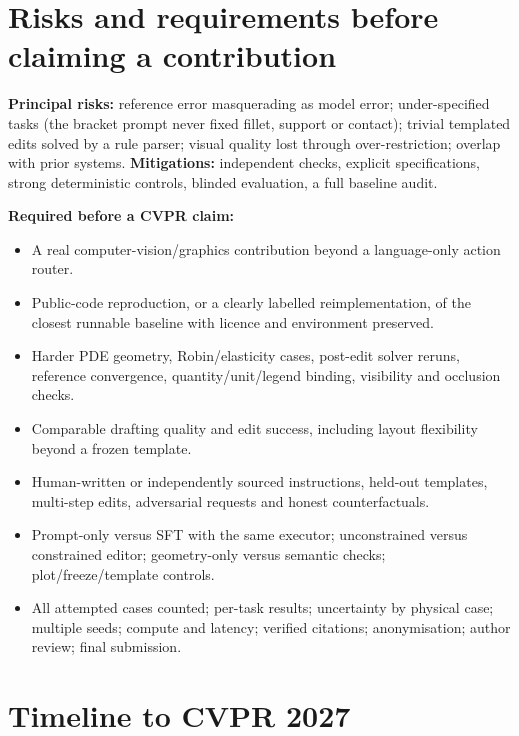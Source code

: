 \documentclass[11pt,a4paper]{article}
\begin{document}
\section{Risks and requirements before claiming a contribution}

\textbf{Principal risks:} reference error masquerading as model error; under-specified tasks (the bracket prompt never fixed fillet, support or contact); trivial templated edits solved by a rule parser; visual quality lost through over-restriction; overlap with prior systems. \textbf{Mitigations:} independent checks, explicit specifications, strong deterministic controls, blinded evaluation, a full baseline audit.

\textbf{Required before a CVPR claim:}
\begin{itemize}
  \item A real computer-vision/graphics contribution beyond a language-only action router.
  \item Public-code reproduction, or a clearly labelled reimplementation, of the closest runnable baseline with licence and environment preserved.
  \item Harder PDE geometry, Robin/elasticity cases, post-edit solver reruns, reference convergence, quantity/unit/legend binding, visibility and occlusion checks.
  \item Comparable drafting quality and edit success, including layout flexibility beyond a frozen template.
  \item Human-written or independently sourced instructions, held-out templates, multi-step edits, adversarial requests and honest counterfactuals.
  \item Prompt-only versus SFT with the same executor; unconstrained versus constrained editor; geometry-only versus semantic checks; plot/freeze/template controls.
  \item All attempted cases counted; per-task results; uncertainty by physical case; multiple seeds; compute and latency; verified citations; anonymisation; author review; final submission.
\end{itemize}

\section{Timeline to CVPR 2027}
\end{document}
